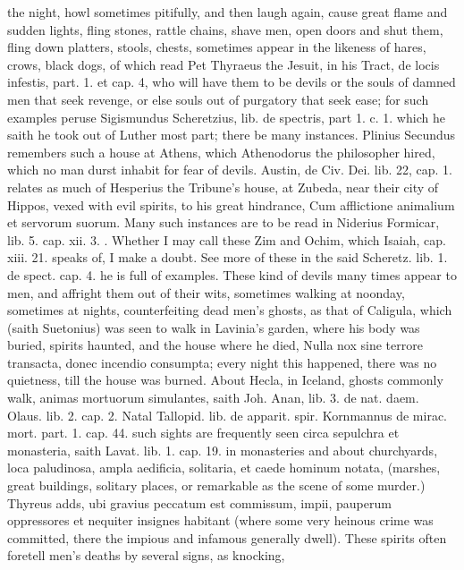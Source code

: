 {the night, howl sometimes pitifully, and then laugh again, cause great
flame and sudden lights, fling stones, rattle chains, shave men, open
doors and shut them, fling down platters, stools, chests, sometimes
appear in the likeness of hares, crows, black dogs, \etc{} of which read
Pet Thyraeus the Jesuit, in his Tract, de locis infestis, part.
1. et cap. 4, who will have them to be devils or the souls of damned
men that seek revenge, or else souls out of purgatory that seek ease;
for such examples peruse  Sigismundus Scheretzius, lib. de
spectris, part 1. c. 1. which he saith he took out of Luther most part;
there be many instances. Plinius Secundus remembers such a house
at Athens, which Athenodorus the philosopher hired, which no man durst
inhabit for fear of devils. Austin, de Civ. Dei. lib. 22, cap. 1.
relates as much of Hesperius the Tribune's house, at Zubeda, near their
city of Hippos, vexed with evil spirits, to his great hindrance, Cum
afflictione animalium et servorum suorum. Many such instances are to be
read in Niderius Formicar, lib. 5. cap. xii. 3. \etc{}. Whether I may call
these Zim and Ochim, which Isaiah, cap. xiii. 21. speaks of, I make a
doubt. See more of these in the said Scheretz. lib. 1. de spect. cap.
4. he is full of examples. These kind of devils many times appear to
men, and affright them out of their wits, sometimes walking at
noonday, sometimes at nights, counterfeiting dead men's ghosts,
as that of Caligula, which (saith Suetonius) was seen to walk in
Lavinia's garden, where his body was buried, spirits haunted, and the
house where he died, Nulla nox sine terrore transacta, donec
incendio consumpta; every night this happened, there was no quietness,
till the house was burned. About Hecla, in Iceland, ghosts commonly
walk, animas mortuorum simulantes, saith Joh. Anan, lib. 3. de nat.
daem. Olaus. lib. 2. cap. 2. Natal Tallopid. lib. de apparit. spir.
Kornmannus de mirac. mort. part. 1. cap. 44. such sights are frequently
seen circa sepulchra et monasteria, saith Lavat. lib. 1. cap. 19. in
monasteries and about churchyards, loca paludinosa, ampla aedificia,
solitaria, et caede hominum notata, \etc{} (marshes, great buildings,
solitary places, or remarkable as the scene of some murder.) Thyreus
adds, ubi gravius peccatum est commissum, impii, pauperum oppressores
et nequiter insignes habitant (where some very heinous crime was
committed, there the impious and infamous generally dwell). These
spirits often foretell men's deaths by several signs, as knocking,
}
